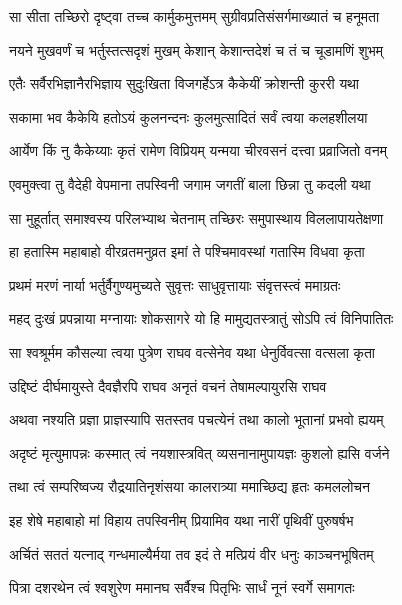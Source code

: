 
\twolineshloka
{सा सीता तच्छिरो दृष्ट्वा तच्च कार्मुकमुत्तमम्}
{सुग्रीवप्रतिसंसर्गमाख्यातं च हनूमता} %

\twolineshloka
{नयने मुखवर्णं च भर्तुस्तत्सदृशं मुखम्}
{केशान् केशान्तदेशं च तं च चूडामणिं शुभम्} %

\twolineshloka
{एतैः सर्वैरभिज्ञानैरभिज्ञाय सुदुःखिता}
{विजगर्हेऽत्र कैकेयीं क्रोशन्ती कुररी यथा} %

\twolineshloka
{सकामा भव कैकेयि हतोऽयं कुलनन्दनः}
{कुलमुत्सादितं सर्वं त्वया कलहशीलया} %

\twolineshloka
{आर्येण किं नु कैकेय्याः कृतं रामेण विप्रियम्}
{यन्मया चीरवसनं दत्त्वा प्रव्राजितो वनम्} %

\twolineshloka
{एवमुक्त्वा तु वैदेही वेपमाना तपस्विनी}
{जगाम जगतीं बाला छिन्ना तु कदली यथा} %

\twolineshloka
{सा मुहूर्तात् समाश्वस्य परिलभ्याथ चेतनाम्}
{तच्छिरः समुपास्थाय विललापायतेक्षणा} %

\twolineshloka
{हा हतास्मि महाबाहो वीरव्रतमनुव्रत}
{इमां ते पश्चिमावस्थां गतास्मि विधवा कृता} %

\twolineshloka
{प्रथमं मरणं नार्या भर्तुर्वैगुण्यमुच्यते}
{सुवृत्तः साधुवृत्तायाः संवृत्तस्त्वं ममाग्रतः} %

\twolineshloka
{महद् दुःखं प्रपन्नाया मग्नायाः शोकसागरे}
{यो हि मामुद्यतस्त्रातुं सोऽपि त्वं विनिपातितः} %

\twolineshloka
{सा श्वश्रूर्मम कौसल्या त्वया पुत्रेण राघव}
{वत्सेनेव यथा धेनुर्विवत्सा वत्सला कृता} %

\twolineshloka
{उद्दिष्टं दीर्घमायुस्ते दैवज्ञैरपि राघव}
{अनृतं वचनं तेषामल्पायुरसि राघव} %

\twolineshloka
{अथवा नश्यति प्रज्ञा प्राज्ञस्यापि सतस्तव}
{पचत्येनं तथा कालो भूतानां प्रभवो ह्ययम्} %

\twolineshloka
{अदृष्टं मृत्युमापन्नः कस्मात् त्वं नयशास्त्रवित्}
{व्यसनानामुपायज्ञः कुशलो ह्यसि वर्जने} %

\twolineshloka
{तथा त्वं सम्परिष्वज्य रौद्रयातिनृशंसया}
{कालरात्र्या ममाच्छिद्य हृतः कमललोचन} %

\twolineshloka
{इह शेषे महाबाहो मां विहाय तपस्विनीम्}
{प्रियामिव यथा नारीं पृथिवीं पुरुषर्षभ} %

\twolineshloka
{अर्चितं सततं यत्नाद् गन्धमाल्यैर्मया तव}
{इदं ते मत्प्रियं वीर धनुः काञ्चनभूषितम्} %

\twolineshloka
{पित्रा दशरथेन त्वं श्वशुरेण ममानघ}
{सर्वैश्च पितृभिः सार्धं नूनं स्वर्गे समागतः} %

